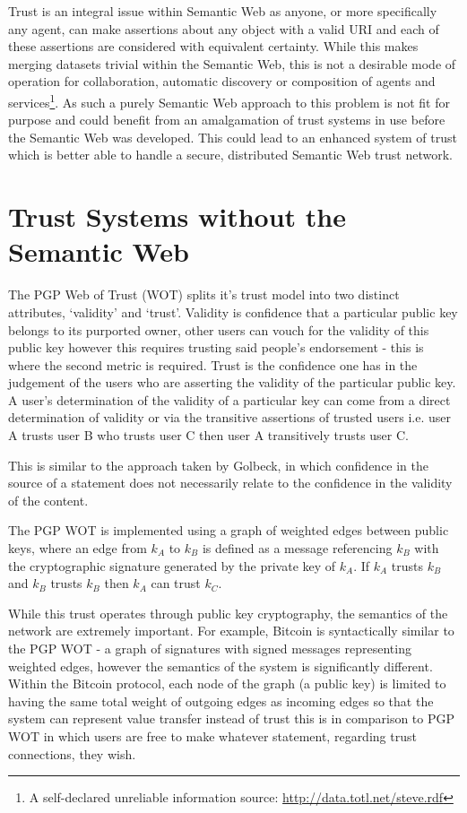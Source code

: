 \documentclass{acm_proc_article-sp}
\begin{document}
Trust is an integral issue within Semantic Web as anyone, or more specifically any agent, can make assertions about any object with a valid URI and each of these assertions are considered with equivalent certainty.  While this makes merging datasets trivial within the Semantic Web\cite{golbeck_trust_2003}, this is not a desirable mode of operation for collaboration, automatic discovery or composition of agents and services\footnote{A self-declared unreliable information source: \url{http://data.totl.net/steve.rdf}}. As such a purely Semantic Web approach to this problem is not fit for purpose and could benefit from an amalgamation of trust systems in use before the Semantic Web was developed.  This could lead to an enhanced system of trust which is better able to handle a secure, distributed Semantic Web trust network.

\section{Trust Systems without the Semantic Web}
The PGP Web of Trust (WOT)\cite{_how_pgp_1999} splits it's trust model into two distinct attributes, `validity' and `trust'.   Validity is confidence that a particular public key belongs to its purported owner, other users can vouch for the validity of this public key however this requires trusting said people's endorsement - this is where the second metric is required.  Trust is the confidence one has in the judgement of the users who are asserting the validity of the particular public key.  A user's determination of the validity of a particular key can come from a direct determination of validity or via the transitive assertions of trusted users i.e. user A trusts user B who trusts user C then user A transitively trusts user C.

This is similar to the approach taken by Golbeck, in which confidence in the source of a statement does not necessarily relate to the confidence in the validity of the content.

The PGP WOT is implemented using a graph of weighted edges between public keys, where an edge from $k_A$ to $k_B$ is defined as a message referencing $k_B$ with the cryptographic signature generated by the private key of $k_A$. If $k_A$ trusts $k_B$ and $k_B$ trusts $k_B$ then $k_A$ can trust $k_C$.

While this trust operates through public key cryptography, the semantics of the network are extremely important. For example, Bitcoin is syntactically similar to the PGP WOT - a graph of signatures with signed messages representing weighted edges, however the semantics of the system is significantly different\cite{bitcoin}. Within the Bitcoin protocol, each node of the graph (a public key) is limited to having the same total weight of outgoing edges as incoming edges so that the system can represent value transfer instead of trust this is in comparison to PGP WOT in which users are free to make whatever statement, regarding trust connections, they wish.
\end{document}
